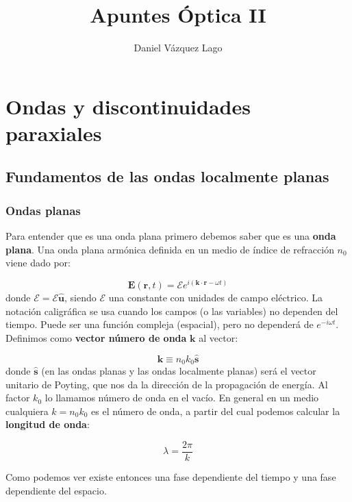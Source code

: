 \documentclass[12pt,a4paper]{book}
\title{Apuntes Óptica II}
\author{Daniel Vázquez Lago}
\numberwithin{equation}{section}
\numberwithin{figure}{section}
\newcommand{\1}{_{(1)}}
\newcommand{\2}{_{(2)}}
\newcommand{\un}{\mathbf{u}}
\newcommand{\rn}{\mathbf{r}}
\newcommand{\kn}{\mathbf{k}}
\newcommand{\sn}{\mathbf{s}}
\newcommand{\En}{\mathbf{E}}
\newcommand{\Encal}{\boldsymbol{\mathcal{E}}}
\newcommand{\hnu}{\hat{\un}}
\newcommand{\hns}{\hat{\sn}}
\theoremstyle{definition}
\begin{document}
\maketitle

\newpage

\tableofcontents

\newpage
\chapter{Ondas y discontinuidades paraxiales}

\section{Fundamentos de las ondas localmente planas}
\subsection{Ondas planas}

Para entender que es una onda plana primero debemos saber que es una \textbf{onda plana}. Una onda plana armónica definida en un medio de índice de refracción $n_0$ viene dado por:

\begin{equation}
\En (\rn,t) = \Encal  e^{i (\kn \cdot \rn - \omega t)}
\end{equation}
donde $ \Encal = \mathcal{E} \hnu$, siendo $\mathcal{E}$ una constante con unidades de campo eléctrico. La notación caligráfica se usa cuando los campos (o las variables) no dependen del tiempo. Puede ser una función compleja (espacial), pero no dependerá de $e^{-i \omega t}$. Definimos como \textbf{vector número de onda} $\kn$ al vector:

\begin{equation}
\kn \equiv n_0 k_0 \hns
\end{equation}
donde $\hns$ (en las ondas planas y las ondas localmente planas) será el vector unitario de Poyting, que nos da la dirección de la propagación de energía. Al factor $k_0$ lo llamamos número de onda en el vacío. En general en un medio cualquiera $k=n_0 k_0$ es el número de onda, a partir del cual podemos calcular la \textbf{longitud de onda}:

\begin{equation}
\lambda = \dfrac{2 \pi}{k}
\end{equation}

Como podemos ver existe entonces una fase dependiente del tiempo y una fase dependiente del espacio.
\end{document}
